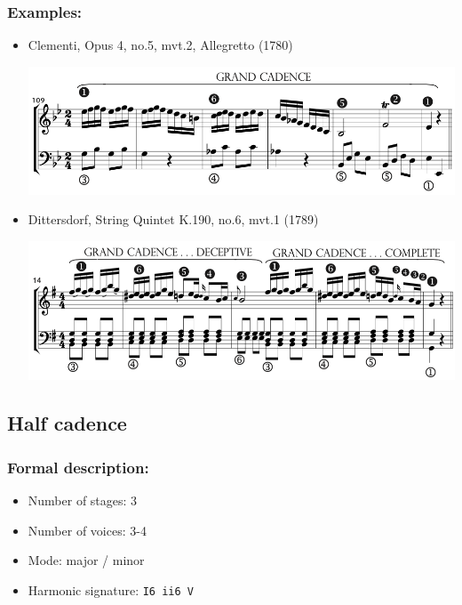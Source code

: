 ﻿\documentclass[11pt, openany]{article}
\begin{document}
\subsubsection{Examples:}
\begin{itemize}
\item Clementi, Opus 4, no.5, mvt.2, Allegretto (1780)
\begin{center}
\includegraphics[scale=0.5]{clementi4.png}
\end{center}
\item Dittersdorf, String Quintet K.190, no.6, mvt.1 (1789)
\begin{center}
\includegraphics[scale=0.5]{dittersdorf190.png}
\end{center}
\end{itemize}

	
	\subsection{Half cadence}

\subsubsection{Formal description:}
\begin{itemize}
\item Number of stages: 3
\item Number of voices: 3-4
\item Mode: major / minor
\item Harmonic signature: \texttt{I6 ii6 V}
\end{itemize}
\end{document}
